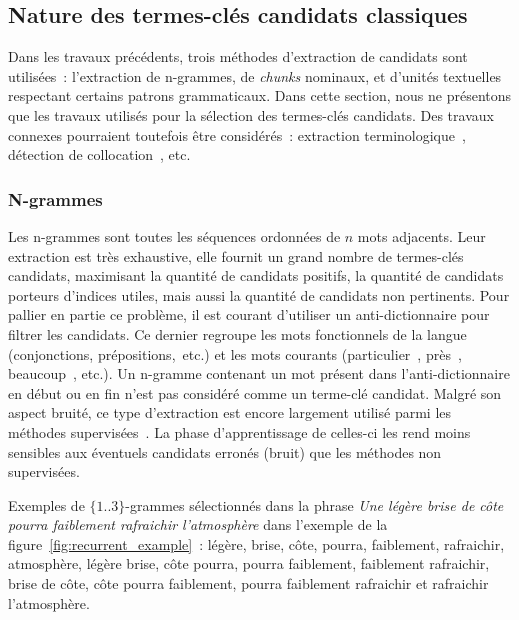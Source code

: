     \subsection{Nature des termes-clés candidats classiques}
    \label{subsec:main-state_of_the_art-keyphrase_candidate_selection-keyphrase_candidate_nature}
      Dans les travaux précédents, trois méthodes d'extraction de candidats sont
      utilisées~: l'extraction de n-grammes, de \textit{chunks} nominaux, et
      d'unités textuelles respectant certains patrons grammaticaux. Dans cette
      section, nous ne présentons que les travaux utilisés pour la sélection des
      termes-clés candidats. Des travaux connexes pourraient toutefois être
      considérés~: extraction
      terminologique~\cite{castellvi2001automatictermdetection}, détection de
      collocation~\cite{pearce2002collocationdetection}, etc.

      \subsubsection{N-grammes}
      \label{subsubsec:main-state_of_the_art-automatic_keyphrase_extraction-automatic_keyphrase_extraction-n_grams}
        Les n-grammes sont toutes les séquences ordonnées de $n$ mots adjacents.
        Leur extraction est très exhaustive, elle fournit un grand nombre de
        termes-clés candidats, maximisant la quantité de candidats positifs, la
        quantité de candidats porteurs d'indices utiles, mais aussi la quantité
        de candidats non pertinents. Pour pallier en partie ce problème, il est
        courant d'utiliser un anti-dictionnaire pour filtrer les candidats. Ce
        dernier regroupe les mots fonctionnels de la langue (conjonctions,
        prépositions,~etc.) et les mots courants (\og particulier~\fg, \og
        près~\fg, \og beaucoup~\fg, etc.). Un n-gramme contenant un mot présent
        dans l'anti-dictionnaire en début ou en fin n'est pas considéré comme un
        terme-clé candidat. Malgré son aspect bruité, ce type d'extraction est
        encore largement utilisé parmi les méthodes
        supervisées~\cite{witten1999kea,turney1999learningalgorithms,hulth2003keywordextraction}.
        La phase d'apprentissage de celles-ci les rend moins sensibles aux
        éventuels candidats erronés (bruit) que les méthodes non supervisées.

        Exemples de $\{1..3\}$-grammes sélectionnés dans la phrase
        \textit{\og{}Une légère brise de côte pourra faiblement rafraichir
        l'atmosphère\fg{}} dans l'exemple de la
        figure~\ref{fig:recurrent_example}~: \og{}légère\fg{}, \og{}brise\fg{},
        \og{}côte\fg{}, \og{}pourra\fg{}, \og{}faiblement\fg{},
        \og{}rafraichir\fg{}, \og{}atmosphère\fg{}, \og{}légère brise\fg{},
        \og{}côte pourra\fg{}, \og{}pourra faiblement\fg{}, \og{}faiblement
        rafraichir\fg{}, \og{}brise de côte\fg{}, \og{}côte pourra
        faiblement\fg{}, \og{}pourra faiblement rafraichir\fg{} et
        \og{}rafraichir l'atmosphère\fg{}.

